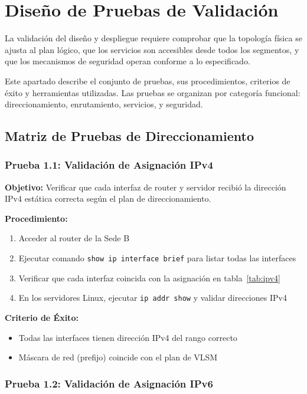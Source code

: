 \section{Diseño de Pruebas de Validación}

La validación del diseño y despliegue requiere comprobar que la topología
física se ajusta al plan lógico, que los servicios son accesibles desde todos
los segmentos, y que los mecanismos de seguridad operan conforme a lo especificado.

Este apartado describe el conjunto de pruebas, sus procedimientos, criterios de
éxito y herramientas utilizadas. Las pruebas se organizan por categoría
funcional: direccionamiento, enrutamiento, servicios, y seguridad.

\subsection{Matriz de Pruebas de Direccionamiento}

\subsubsection{Prueba 1.1: Validación de Asignación IPv4}

\textbf{Objetivo:} Verificar que cada interfaz de router y servidor recibió la
dirección IPv4 estática correcta según el plan de direccionamiento.

\textbf{Procedimiento:}
\begin{enumerate}
\item Acceder al router de la Sede B
\item Ejecutar comando \texttt{show ip interface brief} para listar todas las interfaces
\item Verificar que cada interfaz coincida con la asignación en tabla~\ref{tab:ipv4}
\item En los servidores Linux, ejecutar \texttt{ip addr show} y validar direcciones IPv4
\end{enumerate}

\textbf{Criterio de Éxito:}
\begin{itemize}
\item Todas las interfaces tienen dirección IPv4 del rango correcto
\item Máscara de red (prefijo) coincide con el plan de VLSM
\end{itemize}


\subsubsection{Prueba 1.2: Validación de Asignación IPv6}

